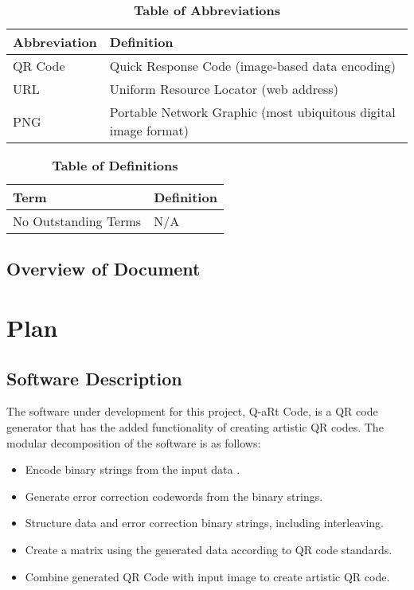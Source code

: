 \documentclass[12pt, titlepage]{article}
\begin{document}
\begin{table}[hbp]
\caption{\textbf{Table of Abbreviations}} \label{Table}

\begin{tabularx}{\textwidth}{p{3cm}X}
\toprule
\textbf{Abbreviation} & \textbf{Definition} \\
\midrule
QR Code & Quick Response Code (image-based data encoding)\\
URL & Uniform Resource Locator (web address)\\
PNG & Portable Network Graphic (most ubiquitous digital image format)\\
\bottomrule
\end{tabularx}

\end{table}

\begin{table}[!htbp]
\caption{\textbf{Table of Definitions}} \label{Table}

\begin{tabularx}{\textwidth}{p{3cm}X}
\toprule
\textbf{Term} & \textbf{Definition}\\
\midrule
No Outstanding Terms & N/A\\
\bottomrule
\end{tabularx}

\end{table}	

\subsection{Overview of Document}

\section{Plan}
	
\subsection{Software Description}
	The software under development for this project, Q-aRt Code, is a QR code 
	generator that has the added functionality of creating artistic QR codes. 
	The modular decomposition of the software is as follows:
	\begin{itemize}  
		\item Encode binary strings from the input data .
		\item Generate error correction codewords from the binary strings.
		\item Structure data and error correction binary strings, including 
		interleaving.
		\item Create a matrix using the generated data according to QR code 
		standards.
		\item Combine generated QR Code with input image to create artistic QR 
		code.
	\end{itemize}
\end{document}
